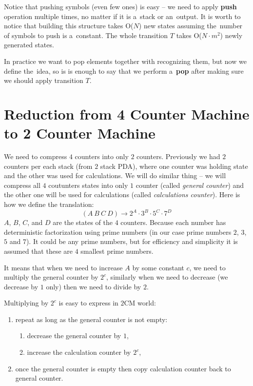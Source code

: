 \documentclass[english,shortabstract,mgr]{iithesis}
\begin{document}
Notice that pushing symbols (even few ones) is easy -- we need to apply \textbf{push} operation
multiple times, no matter if it is a~stack or an~output. It is worth to notice
that building this structure takes O($N$) new states assuming the~number of symbols
to push is a~constant. The whole transition $T$ takes O($N \cdot m^2$) newly
generated states.

In practice we want to pop elements together with recognizing them, but now we define the~idea, so
is is enough to say that we perform a~\textbf{pop} after making sure we should apply transition $T$.

\section {Reduction from 4 Counter Machine to 2 Counter Machine}

We need to compress $4$ counters into only $2$ counters. Previously we had
$2$ counters per each stack (from $2$ stack PDA), where one counter was
holding state and the other was used for calculations. We will do similar
thing -- we will compress all $4$ coutunters states into only $1$ counter
(called \textit{general counter}) and the other one will be used for
calculations (called \textit{calculations counter}). Here is how we define
the translation:
$$ (A\ B\ C\ D) \rightarrow 2^A \cdot 3^B \cdot 5^C \cdot 7^D$$
$A$, $B$, $C$, and $D$ are the states of the $4$ counters. Because each
number has deterministic factorization using prime numbers (in our case
prime numbers $2$, $3$, $5$ and $7$). It could be any prime numbers,
but for efficiency and simplicity it is assumed that these are $4$ smallest
prime numbers.

It means that when we need to increase $A$ by some constant $c$, we need
to multiply the general counter by $2^c$, similarly when we need to decrease
(we decrease by $1$ only) then we need to divide by $2$.

Multiplying by $2^c$ is easy to express in $2$CM world:
\begin{enumerate}
  \item repeat as long as the general counter is not empty:
  \begin{enumerate}
    \item decrease the general counter by $1$,
    \item increase the calculation counter by $2^c$,
  \end{enumerate}
  \item once the general counter is empty then copy calculation counter back to general counter.
\end{enumerate}
\end{document}
